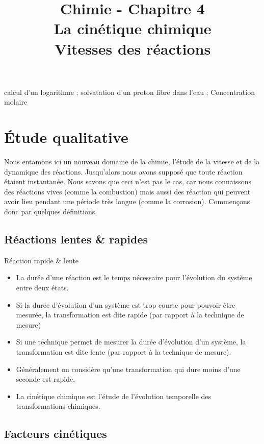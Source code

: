 \documentclass[11pt,a4paper]{article}
\title{\large Chimie - Chapitre 4 \\ \LARGE La cinétique chimique \\ \small Vitesses des réactions}
\date{}
\author{}
\begin{document}
\maketitle
\vspace{-1cm}
\begin{tcolorbox}[title=Notions de la classe de première à rappeler]
calcul d'un logarithme ; solvatation d'un proton libre dans l'eau ; Concentration molaire
\end{tcolorbox}
\tableofcontents

\section{Étude qualitative}

Nous entamons ici un nouveau domaine de la chimie, l'étude de la vitesse et de la dynamique des réactions. Jusqu'alors nous avons supposé que toute réaction étaient instantanée. Nous savons que ceci n'est pas le cas, car nous connaissons des réactions vives (comme la combustion) mais aussi des réaction qui peuvent avoir lieu pendant une période très longue (comme la corrosion). Commençons donc par quelques définitions. 

\subsection{Réactions lentes \& rapides}
\begin{defn}{Réaction rapide \& lente}
\begin{itemize}
    \item La durée d’une réaction est le temps nécessaire pour l’évolution du système entre deux états. 
    \item Si la durée d’évolution d’un système est trop courte pour pouvoir être mesurée, la transformation est dite rapide (par rapport à la technique de mesure)
    \item Si une technique permet de mesurer la durée d’évolution d’un système, la transformation est dite lente (par rapport à la technique de mesure). 
    \item Généralement on considère qu’une transformation qui dure moins d’une seconde est rapide. 
    \item La cinétique chimique est l’étude de l’évolution temporelle des transformations chimiques. 
\end{itemize}
\end{defn}

\subsection{Facteurs cinétiques}
\end{document}
